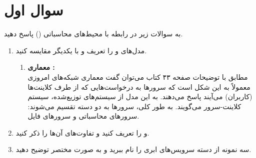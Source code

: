 \section{سوال اول}

به سوالات زیر در رابطه با محیط‌های محاسباتی () پاسخ دهید.

\begin{enumerate}
	\item 
	مدل‌های  و  را تعریف و با یکدیگر مقایسه کنید.
	
	\begin{qsolve}
		\begin{enumerate}
			\item 
			\textbf{معماری : }\\
مطابق با توضیحات صفحه ۴۳ کتاب  می‌توان گفت معماری شبکه‌های امروزی معمولاً به این شکل است که سرورها به درخواست‌هایی که از طرف کلاینت‌ها (کاربران) می‌آیند پاسخ می‌دهند. به این مدل از سیستم‌های توزیع‌شده، سیستم کلاینت-سرور می‌گویند. به طور کلی، سرورها به دو دسته تقسیم می‌شوند: سرورهای محاسباتی و سرورهای فایل.

		
		\end{enumerate}
	\end{qsolve}
	
	\item 
	 \lr{Virtualization} 
	و  را تعریف کنید و تفاوت‌های آن‌ها را ذکر کنید.
	
	\begin{qsolve}
		
	\end{qsolve}
	
	\item 
	سه نمونه از دسته سرویس‌های ابری را نام ببرید و به صورت مختصر توضیح دهید.
	
	\begin{qsolve}
		
	\end{qsolve}
\end{enumerate}